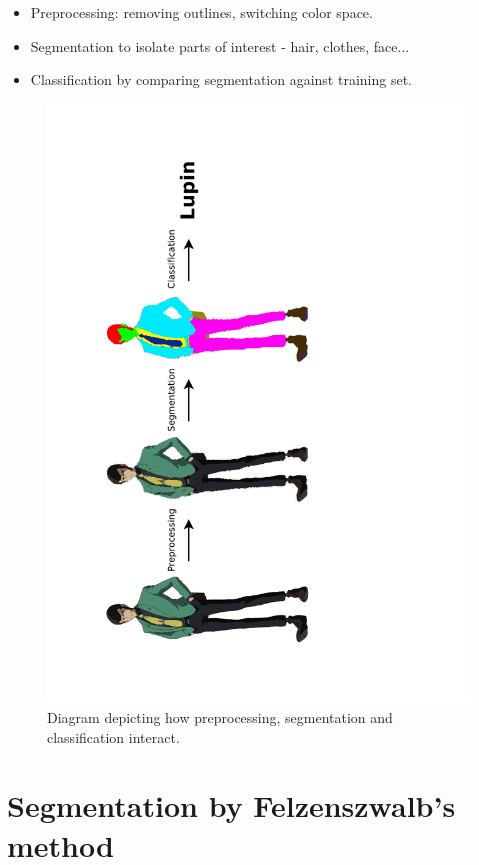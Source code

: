 \documentclass{beamer}
\begin{document}
\begin{frame}
\begin{itemize}
\item Preprocessing: removing outlines, switching color space.
\item Segmentation to isolate parts of interest - hair, clothes, face...
\item Classification by comparing segmentation against training set.
\end{itemize}

\begin{figure}[htb!]
\centerline{
\includegraphics[height=\textwidth,angle=270,clip=true,trim=2cm 0 6cm 0]{../images/visionSystemDiagram.pdf}
}
\caption{Diagram depicting how preprocessing, segmentation and classification interact.}
\end{figure}

\end{frame}

\section{Segmentation by Felzenszwalb's method}
\end{document}
